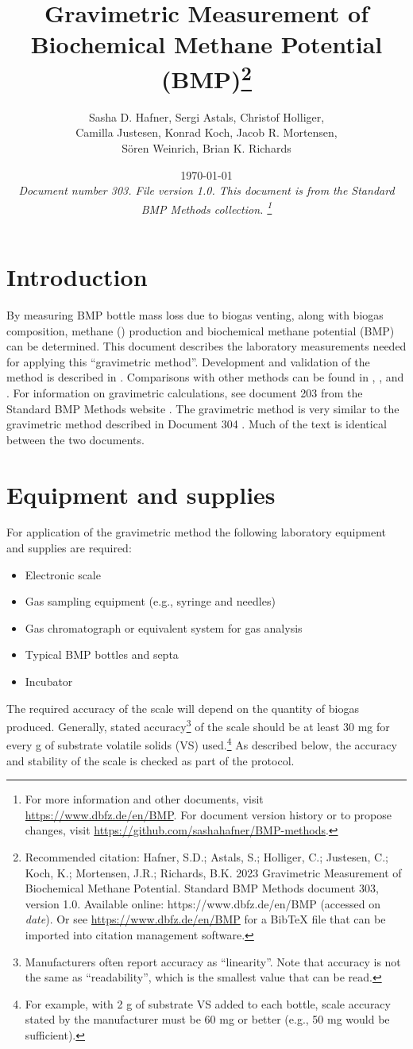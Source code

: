 \documentclass[]{article}
\title {Gravimetric Measurement of Biochemical Methane Potential (BMP)\footnote{
  Recommended citation: 
Hafner, S.D.; Astals, S.; Holliger, C.; Justesen, C.; Koch, K.; Mortensen, J.R.; Richards, B.K. 2023 Gravimetric Measurement of Biochemical Methane Potential. Standard BMP Methods document 303, version 1.0. Available online: https://www.dbfz.de/en/BMP (accessed on \textit{date}).
\newline
  Or see \url{https://www.dbfz.de/en/BMP} for a BibTeX file that can be imported into citation management software.
}
}
\author{Sasha D. Hafner, Sergi Astals, Christof Holliger,\\ Camilla Justesen, Konrad Koch, Jacob R. Mortensen,\\ S\"oren Weinrich, Brian K. Richards}
\date{\today \\
\bigskip
\textit{
  Document number 303.
  File version 1.0. 
  This document is from the Standard BMP Methods collection.
    \footnote{For more information and other documents, visit \url{https://www.dbfz.de/en/BMP}. 
    For document version history or to propose changes, visit \url{https://github.com/sashahafner/BMP-methods}.}
}
}
\begin{document}
\maketitle

\section{Introduction}
By measuring BMP bottle mass loss due to biogas venting, along with biogas composition, methane () production and biochemical methane potential (BMP) can be determined.
This document describes the laboratory measurements needed for applying this ``gravimetric method''.
Development and validation of the method is described in \citet{hafnerValidationSimpleGravimetric2015}.
Comparisons with other methods can be found in \citet{hafnerSystematicErrorManometric2019}, \citet{amodeoHowDifferentAre2020a}, and \citet{hafnerImprovingInterlaboratoryReproducibility2020}.
For information on gravimetric calculations, see document 203 from the Standard BMP Methods website \citep{BMPdoc203grav}. 
The gravimetric method is very similar to the gravimetric method described in Document 304 \citep{BMPdoc204gasdens}.
Much of the text is identical between the two documents.

\section{Equipment and supplies}
\label{sec:equipment}
For application of the gravimetric method the following laboratory equipment and supplies are required:
\begin{itemize}
    \item Electronic scale
    \item Gas sampling equipment (e.g., syringe and needles)
    \item Gas chromatograph or equivalent system for gas analysis
    \item Typical BMP bottles and septa
    \item Incubator
\end{itemize}

The required accuracy of the scale will depend on the quantity of biogas produced. 
Generally, stated accuracy\footnote{
  Manufacturers often report accuracy as ``linearity''. 
  Note that accuracy is not the same as ``readability'', which is the smallest value that can be read. 
} of the scale should be at least 30 mg for every g of substrate volatile solids (VS) used.\footnote{
  For example, with 2 g of substrate VS added to each bottle, scale accuracy stated by the manufacturer must be 60 mg or better (e.g., 50 mg would be sufficient).
}
As described below, the accuracy and stability of the scale is checked as part of the protocol.
\end{document}
